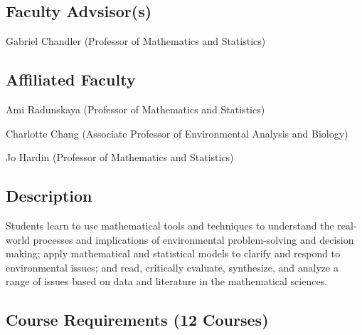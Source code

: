 \documentclass{article}\usepackage[]{graphicx}\usepackage[]{xcolor}
\newenvironment{itemize*}%
  {\begin{itemize}%
    \setlength{\itemsep}{0pt}%
    \setlength{\parskip}{0pt}}%
  {\end{itemize}}
\begin{document}
\subsection{Faculty Advsisor(s)}

\begin{itemize*}
  \item Gabriel Chandler (Professor of Mathematics and Statistics)
\end{itemize*}

\subsection{Affiliated Faculty}

\begin{itemize*}
  \item Ami Radunskaya (Professor of Mathematics and Statistics)
  \item Charlotte Chang (Associate Professor of Environmental Analysis and Biology)
  \item Jo Hardin (Professor of Mathematics and Statistics)
\end{itemize*}

\subsection{Description}

Students learn to use mathematical tools and techniques to understand the real-world processes and implications of environmental problem-solving and decision making; apply mathematical and statistical models to clarify and respond to environmental issues; and read, critically evaluate, synthesize, and analyze a range of issues based on data and literature in the mathematical sciences.


\subsection{Course Requirements (12 Courses)}
\end{document}
